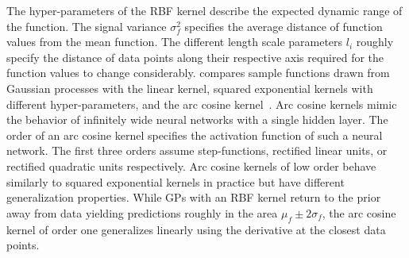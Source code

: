 The hyper-parameters of the RBF kernel describe the expected dynamic range of the function.
The signal variance $\sigma_f^2$ specifies the average distance of function values from the mean function.
The different length scale parameters $l_i$ roughly specify the distance of data points along their respective axis required for the function values to change considerably.
 compares sample functions drawn from Gaussian processes with the linear kernel, squared exponential kernels with different hyper-parameters, and the arc cosine kernel~\parencite{cho_kernel_2009}.
Arc cosine kernels mimic the behavior of infinitely wide neural networks with a single hidden layer.
The order of an arc cosine kernel specifies the activation function of such a neural network.
The first three orders assume step-functions, rectified linear units, or rectified quadratic units respectively.
Arc cosine kernels of low order behave similarly to squared exponential kernels in practice but have different generalization properties.
While GPs with an RBF kernel return to the prior away from data yielding predictions roughly in the area $\mu_f \pm 2\sigma_f$, the arc cosine kernel of order one generalizes linearly using the derivative at the closest data points.

